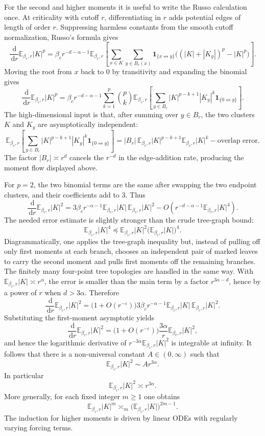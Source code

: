 \documentclass[11pt,reqno]{book}
\numberwithin{equation}{chapter}
\theoremstyle{plain}
\theoremstyle{definition}
\theoremstyle{remark}
\newcommand{\eps}{\varepsilon}
\newcommand{\1}{\mathbf 1}
\newcommand{\dd}{\,\mathrm d}
\newcommand{\as}{\asymp}
\newcommand{\pre}{\preceq}
\begin{document}
For the second and higher moments it is useful to write the Russo calculation
once. At criticality with cutoff \(r\), differentiating in \(r\) adds
potential edges of length of order \(r\). Suppressing harmless constants from
the smooth cutoff normalization, Russo's formula gives
\[
  \frac{\dd}{\dd r}\mathbb E_{\beta_c,r}|K|^p
  =
  \beta_c r^{-d-\alpha-1}
  \mathbb E_{\beta_c,r}\!\left[
    \sum_{x\in K}
    \sum_{y\in B_r(x)}
    \1_{\{x\not\leftrightarrow y\}}
    \bigl((|K|+|K_y|)^p-|K|^p\bigr)
  \right].
\]
Moving the root from \(x\) back to \(0\) by transitivity and expanding the
binomial gives
\[
  \frac{\dd}{\dd r}\mathbb E_{\beta_c,r}|K|^p
  =
  \beta_c r^{-d-\alpha-1}
  \sum_{k=1}^p \binom pk
  \mathbb E_{\beta_c,r}\!\left[
    \sum_{y\in B_r}
    |K|^{p-k+1}|K_y|^k
    \1_{\{0\not\leftrightarrow y\}}
  \right].
\]
The high-dimensional input is that, after summing over \(y\in B_r\), the two
clusters \(K\) and \(K_y\) are asymptotically independent:
\[
  \mathbb E_{\beta_c,r}\!\left[
    \sum_{y\in B_r}
    |K|^{p-k+1}|K_y|^k
    \1_{\{0\not\leftrightarrow y\}}
  \right]
  =
  |B_r|\,\mathbb E_{\beta_c,r}|K|^{p-k+1}
        \mathbb E_{\beta_c,r}|K|^k
  -
  \text{overlap error}.
\]
The factor \(|B_r|\asymp r^d\) cancels the \(r^{-d}\) in the edge-addition
rate, producing the moment flow displayed above.

For \(p=2\), the two binomial terms are the same after swapping the two
endpoint clusters, and their coefficients add to \(3\). Thus
\[
  \frac{\dd}{\dd r}\mathbb E_{\beta_c,r}|K|^2
  =
  3\beta_c r^{-\alpha-1}
  \mathbb E_{\beta_c,r}|K|\,
  \mathbb E_{\beta_c,r}|K|^2
  -
  O\!\left(
    r^{-d-\alpha-1}\mathbb E_{\beta_c,r}|K|^4
  \right).
\]
The needed error estimate is slightly stronger than the crude tree-graph
bound:
\[
  \mathbb E_{\beta_c,r}|K|^4
  \pre
  \mathbb E_{\beta_c,r}|K|^2
  \bigl(\mathbb E_{\beta_c,r}|K|\bigr)^4.
\]
Diagrammatically, one applies the tree-graph inequality but, instead of
pulling off only first moments at each branch, chooses an independent pair of
marked leaves to carry the second moment and pulls first moments off the
remaining branches. The finitely many four-point tree topologies are handled
in the same way. With
\(\mathbb E_{\beta_c,r}|K|\asymp r^\alpha\), the error is smaller than the
main term by a factor \(r^{3\alpha-d}\), hence by a power of \(r\) when
\(d>3\alpha\). Therefore
\[
  \frac{\dd}{\dd r}\mathbb E_{\beta_c,r}|K|^2
  =
  \bigl(1+O(r^{-\eps})\bigr)
  3\beta_c r^{-\alpha-1}
  \mathbb E_{\beta_c,r}|K|\,
  \mathbb E_{\beta_c,r}|K|^2 .
\]
Substituting the first-moment asymptotic yields
\[
  \frac{\dd}{\dd r}\mathbb E_{\beta_c,r}|K|^2
  =
  \bigl(1+O(r^{-\eps})\bigr)
  \frac{3\alpha}{r}
  \mathbb E_{\beta_c,r}|K|^2,
\]
and hence the logarithmic derivative of
\(r^{-3\alpha}\mathbb E_{\beta_c,r}|K|^2\) is integrable at infinity. It
follows that there is a non-universal constant \(A\in(0,\infty)\) such that
\[
  \mathbb E_{\beta_c,r}|K|^2\sim A r^{3\alpha}.
\]
In particular
\[
  \mathbb E_{\beta_c,r}|K|^2\as r^{3\alpha}.
\]
More generally, for each fixed integer $m\geq1$ one obtains
\[
  \mathbb E_{\beta_c,r}|K|^m
  \as_m
  \bigl(\mathbb E_{\beta_c,r}|K|\bigr)^{2m-1}.
\]
The induction for higher moments is driven by linear ODEs with regularly varying forcing terms.
\end{document}

